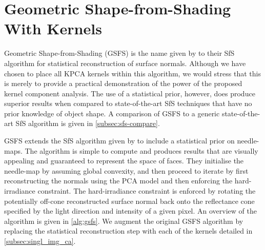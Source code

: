 \section{Geometric Shape-from-Shading With Kernels}\label{sec:singl_img_gsfs}
Geometric Shape-from-Shading (GSFS) is the name given by 
\cite{smith2006recovering,worthington1999new,smith2008facial} to their 
SfS algorithm for statistical 
reconstruction of surface normals. Although we have chosen to place all KPCA
kernels within this algorithm, we would stress that this is merely to provide a
practical demonstration of the power of the proposed kernel component analysis.
The use of a statistical prior, however, does produce superior results when
compared to state-of-the-art SfS techniques that have no prior knowledge of
object shape. A comparison of GSFS to a generic state-of-the-art SfS algorithm
is given in \cref{subsec:sfs-compare}.

GSFS extends the SfS algorithm given by \citet{worthington1999new} to include a 
statistical prior on needle-maps. The algorithm
is simple to compute and produces results that are visually appealing and
guaranteed to represent the space of faces. They initialise the needle-map by
assuming global convexity, and then proceed to iterate by first reconstructing
the normals using the PCA model and then enforcing the hard-irradiance
constraint. The hard-irradiance constraint is enforced by rotating the
potentially off-cone reconstructed surface normal back onto the reflectance cone
specified by the light direction and intensity of a given pixel. An overview of
the algorithm is given in \cref{alg:gsfs}. We augment the original GSFS
algorithm by replacing the statistical reconstruction step with each of the
kernels detailed in \cref{subsec:singl_img_ca}.

